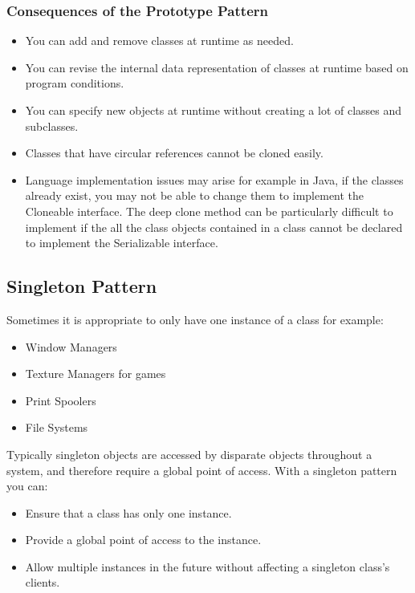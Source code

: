 \documentclass[12pt letter]{report}
\begin{document}
\subsubsection{Consequences of the Prototype Pattern}
\begin{itemize}
  \item You can add and remove classes at runtime as needed.
  \item You can revise the internal data representation of classes at runtime based on program conditions.
  \item You can specify new objects at runtime without creating a lot of classes and subclasses.
  \item Classes that have circular references cannot be cloned easily.
  \item Language implementation issues may arise for example in Java, if the classes already exist, you may not be able to change them to implement
        the Cloneable interface. The deep clone method can be particularly difficult to implement if the all the class objects contained in a class
        cannot be declared to implement the Serializable interface.
\end{itemize}

\subsection{Singleton Pattern}

Sometimes it is appropriate to only have one instance of a class for example:
\begin{itemize}
  \item Window Managers
  \item Texture Managers for games
  \item Print Spoolers
  \item File Systems
\end{itemize}
Typically singleton objects are accessed by disparate objects throughout a system, and therefore require a global point of access. With a singleton pattern
you can:
\begin{itemize}
  \item Ensure that a class has only one instance.
  \item Provide a global point of access to the instance.
  \item Allow multiple instances in the future without affecting a singleton class's clients.
\end{itemize}

\end{document}
